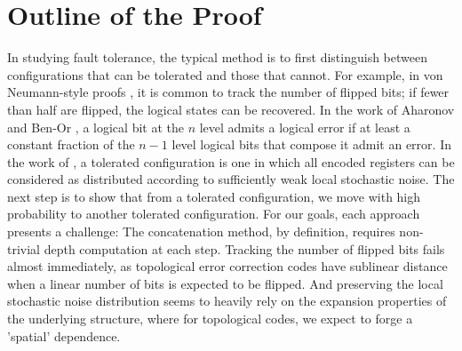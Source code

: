 \section{Outline of the Proof}
In studying fault tolerance, the typical method is to first distinguish between configurations that can be tolerated and those that cannot. For example, in von Neumann-style proofs \cite{Neumann+1956+43+98}, it is common to track the number of flipped bits; if fewer than half are flipped, the logical states can be recovered. In the work of Aharonov and Ben-Or \cite{aharonov1999faulttolerant}, a logical bit at the $n$ level admits a logical error if at least a constant fraction of the $n-1$ level logical bits that compose it admit an error. In the work of \cite{grospellier:tel-03364419}, a tolerated configuration is one in which all encoded registers can be considered as distributed according to sufficiently weak local stochastic noise. The next step is to show that from a tolerated configuration, we move with high probability to another tolerated configuration. For our goals, each approach presents a challenge: The concatenation method, by definition, requires non-trivial depth computation at each step. Tracking the number of flipped bits fails almost immediately, as topological error correction codes have sublinear distance when a linear number of bits is expected to be flipped. And preserving the local stochastic noise distribution seems to heavily rely on the expansion properties \cite{grospellier:tel-03364419} of the underlying structure, where for topological codes, we expect to forge a 'spatial' dependence.


